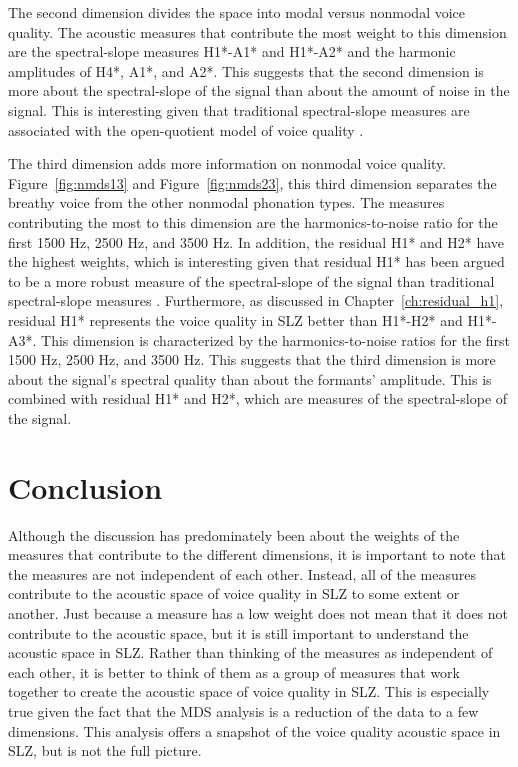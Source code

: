 The second dimension divides the space into modal versus nonmodal voice quality. The acoustic measures that contribute the most weight to this dimension are the spectral-slope measures H1*-A1* and H1*-A2* and the harmonic amplitudes of H4*, A1*, and A2*. This suggests that the second dimension is more about the spectral-slope of the signal than about the amount of noise in the signal. This is interesting given that traditional spectral-slope measures are associated with the open-quotient model of voice quality \citep{holmbergComparisonsAerodynamicElectroglottographic1995,kreimanMeasuresGlottalSource2007,garellekModelingVoiceSource2016,garellekPhoneticsVoice2019,chaiH1H2Acoustic2022}.

The third dimension adds more information on nonmodal voice quality. Figure~\ref{fig:nmds13} and Figure~\ref{fig:nmds23}, this third dimension separates the breathy voice from the other nonmodal phonation types. The measures contributing the most to this dimension are the harmonics-to-noise ratio for the first 1500 Hz, 2500 Hz, and 3500 Hz. In addition, the residual H1* and H2* have the highest weights, which is interesting given that residual H1* has been argued to be a more robust measure of the spectral-slope of the signal than traditional spectral-slope measures \citep{chaiH1H2Acoustic2022,brinkerhoffResidualH1Measure2024}. Furthermore, as discussed in Chapter~\ref{ch:residual_h1}, residual H1* represents the voice quality in SLZ better than H1*-H2* and H1*-A3*. This dimension is characterized by the harmonics-to-noise ratios for the first 1500 Hz, 2500 Hz, and 3500 Hz. This suggests that the third dimension is more about the signal's spectral quality than about the formants' amplitude. This is combined with residual H1* and H2*, which are measures of the spectral-slope of the signal.

\section{Conclusion} \label{sec:acousticlandscape:conclusion}

Although the discussion has predominately been about the weights of the measures that contribute to the different dimensions, it is important to note that the measures are not independent of each other. Instead, all of the measures contribute to the acoustic space of voice quality in SLZ to some extent or another. Just because a measure has a low weight does not mean that it does not contribute to the acoustic space, but it is still important to understand the acoustic space in SLZ. Rather than thinking of the measures as independent of each other, it is better to think of them as a group of measures that work together to create the acoustic space of voice quality in SLZ. This is especially true given the fact that the MDS analysis is a reduction of the data to a few dimensions. This analysis offers a snapshot of the voice quality acoustic space in SLZ, but is not the full picture. 

